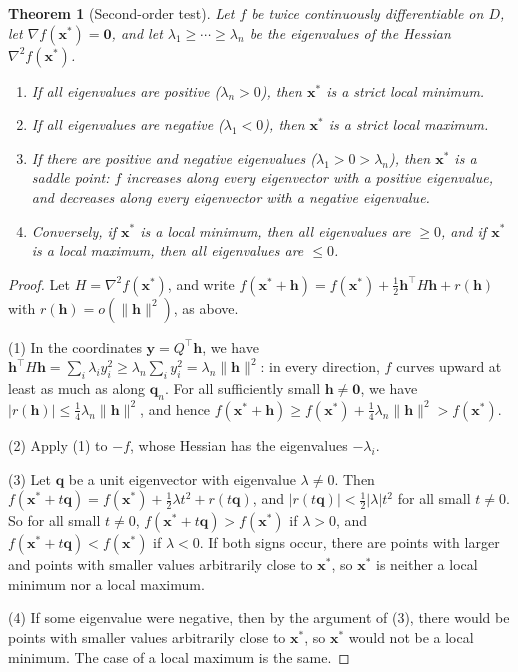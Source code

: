 \documentclass[11pt]{article}
\newcommand{\norm}[1]{\lVert #1 \rVert}
\theoremstyle{definition}
\theoremstyle{plain}
\newtheorem{theorem}[definition]{Theorem}
\theoremstyle{remark}
\begin{document}
\begin{theorem}[Second-order test]\label{thm:second-order}
    Let $f$ be twice continuously differentiable on $D$, let $\nabla f(\mathbf{x}^*) = \mathbf{0}$, and let $\lambda_1 \geq \cdots \geq \lambda_n$ be the eigenvalues of the Hessian $\nabla^2 f(\mathbf{x}^*)$.
    \begin{enumerate}
        \item If all eigenvalues are positive ($\lambda_n > 0$), then $\mathbf{x}^*$ is a strict local minimum.
        \item If all eigenvalues are negative ($\lambda_1 < 0$), then $\mathbf{x}^*$ is a strict local maximum.
        \item If there are positive and negative eigenvalues ($\lambda_1 > 0 > \lambda_n$), then $\mathbf{x}^*$ is a saddle point: $f$ increases along every eigenvector with a positive eigenvalue, and decreases along every eigenvector with a negative eigenvalue.
        \item Conversely, if $\mathbf{x}^*$ is a local minimum, then all eigenvalues are $\geq 0$, and if $\mathbf{x}^*$ is a local maximum, then all eigenvalues are $\leq 0$.
    \end{enumerate}
\end{theorem}

\begin{proof}
    Let $H = \nabla^2 f(\mathbf{x}^*)$, and write $f(\mathbf{x}^* + \mathbf{h}) = f(\mathbf{x}^*) + \frac{1}{2}\mathbf{h}^\top H\mathbf{h} + r(\mathbf{h})$ with $r(\mathbf{h}) = o(\norm{\mathbf{h}}^2)$, as above.

    (1) In the coordinates $\mathbf{y} = Q^\top\mathbf{h}$, we have $\mathbf{h}^\top H\mathbf{h} = \sum_i \lambda_i y_i^2 \geq \lambda_n \sum_i y_i^2 = \lambda_n\norm{\mathbf{h}}^2$: in every direction, $f$ curves upward at least as much as along $\mathbf{q}_n$. For all sufficiently small $\mathbf{h} \neq \mathbf{0}$, we have $|r(\mathbf{h})| \leq \frac{1}{4}\lambda_n\norm{\mathbf{h}}^2$, and hence $f(\mathbf{x}^* + \mathbf{h}) \geq f(\mathbf{x}^*) + \frac{1}{4}\lambda_n\norm{\mathbf{h}}^2 > f(\mathbf{x}^*)$.

    (2) Apply (1) to $-f$, whose Hessian has the eigenvalues $-\lambda_i$.

    (3) Let $\mathbf{q}$ be a unit eigenvector with eigenvalue $\lambda \neq 0$. Then $f(\mathbf{x}^* + t\mathbf{q}) = f(\mathbf{x}^*) + \frac{1}{2}\lambda t^2 + r(t\mathbf{q})$, and $|r(t\mathbf{q})| < \frac{1}{2}|\lambda| t^2$ for all small $t \neq 0$. So for all small $t \neq 0$, $f(\mathbf{x}^* + t\mathbf{q}) > f(\mathbf{x}^*)$ if $\lambda > 0$, and $f(\mathbf{x}^* + t\mathbf{q}) < f(\mathbf{x}^*)$ if $\lambda < 0$. If both signs occur, there are points with larger and points with smaller values arbitrarily close to $\mathbf{x}^*$, so $\mathbf{x}^*$ is neither a local minimum nor a local maximum.

    (4) If some eigenvalue were negative, then by the argument of (3), there would be points with smaller values arbitrarily close to $\mathbf{x}^*$, so $\mathbf{x}^*$ would not be a local minimum. The case of a local maximum is the same.
\end{proof}
\end{document}
